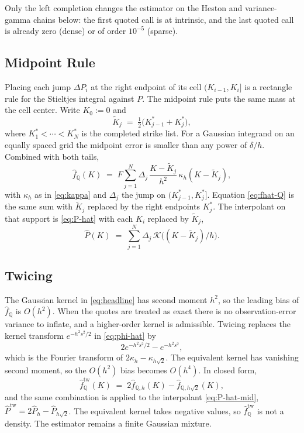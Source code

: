\documentclass[preprint,12pt,authoryear,times]{elsarticle}
\newcommand{\Q}{\mathbb{Q}}
\begin{document}
Only the left completion changes the estimator on the Heston and variance-gamma chains below: the first quoted call is at intrinsic, and the last quoted call is already zero (dense) or of order \(10^{-5}\) (sparse).

\subsection{Midpoint Rule}
\label{sec:mid}

Placing each jump \(\Delta P_i\) at the right endpoint of its cell \((K_{i-1},K_i]\) is a rectangle rule for the Stieltjes integral against \(P\). The midpoint rule puts the same mass at the cell center. Write \(K_0:=0\) and
\begin{equation}
\label{eq:mid}
\tilde K_j
\;=\;
\tfrac12\bigl(K_{j-1}^{\ast}+K_j^{\ast}\bigr),
\end{equation}
where \(K_1^{\ast}<\cdots<K_N^{\ast}\) is the completed strike list. For a Gaussian integrand on an equally spaced grid the midpoint error is smaller than any power of \(\delta/h\). Combined with both tails,
\begin{equation}
\label{eq:headline}
\hat f_{\Q}(K)
\;=\;
F\sum_{j=1}^{N}\Delta_j\,\frac{K-\tilde K_j}{h^2}\,\kappa_h(K-\tilde K_j),
\end{equation}
with \(\kappa_h\) as in \eqref{eq:kappa} and \(\Delta_j\) the jump on \((K_{j-1}^{\ast},K_j^{\ast}]\). Equation \eqref{eq:fhat-Q} is the same sum with \(\tilde K_j\) replaced by the right endpoints \(K_j^{\ast}\). The interpolant on that support is \eqref{eq:P-hat} with each \(K_i\) replaced by \(\tilde K_j\),
\begin{equation}
\label{eq:P-hat-mid}
\hat P(K)
\;=\;
\sum_{j=1}^{N}\Delta_j\,\mathcal{K}\bigl((K-\tilde K_j)/h\bigr).
\end{equation}

\subsection{Twicing}
\label{sec:twice}

The Gaussian kernel in \eqref{eq:headline} has second moment \(h^2\), so the leading bias of \(\hat f_{\Q}\) is \(O(h^2)\). When the quotes are treated as exact there is no observation-error variance to inflate, and a higher-order kernel is admissible. Twicing \citep{schucanysommers1977} replaces the kernel transform \(e^{-h^2 s^2/2}\) in \eqref{eq:phi-hat} by
\begin{equation}
\label{eq:phi-twice}
2e^{-h^2 s^2/2}-e^{-h^2 s^2},
\end{equation}
which is the Fourier transform of \(2\kappa_h-\kappa_{h\sqrt{2}}\). The equivalent kernel has vanishing second moment, so the \(O(h^2)\) bias becomes \(O(h^4)\). In closed form,
\begin{equation}
\label{eq:twice}
\hat f_{\Q}^{\mathrm{tw}}(K)
\;=\;
2\hat f_{\Q,h}(K)-\hat f_{\Q,h\sqrt{2}}(K),
\end{equation}
and the same combination is applied to the interpolant \eqref{eq:P-hat-mid}, \(\hat P^{\mathrm{tw}}=2\hat P_h-\hat P_{h\sqrt{2}}\). The equivalent kernel takes negative values, so \(\hat f_{\Q}^{\mathrm{tw}}\) is not a density. The estimator remains a finite Gaussian mixture.
\end{document}
